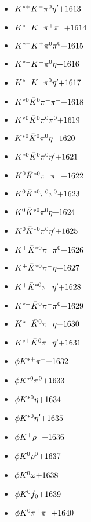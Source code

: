 \begin{multicols}{3}
\begin{itemize}
 \item $ K^{*+} K^{-} \pi^{0} {\eta^{\prime}} \hfill{+1613}$
 \item $ K^{*-} K^{+} \pi^{+} \pi^{-} \hfill{+1614}$
 \item $ K^{*-} K^{+} \pi^{0} \pi^{0} \hfill{+1615}$
 \item $ K^{*-} K^{+} \pi^{0} \eta \hfill{+1616}$
 \item $ K^{*-} K^{+} \pi^{0} {\eta^{\prime}} \hfill{+1617}$
 \item $ K^{*0} \bar{K}^{0} \pi^{+} \pi^{-} \hfill{+1618}$
 \item $ K^{*0} \bar{K}^{0} \pi^{0} \pi^{0} \hfill{+1619}$
 \item $ K^{*0} \bar{K}^{0} \pi^{0} \eta \hfill{+1620}$
 \item $ K^{*0} \bar{K}^{0} \pi^{0} {\eta^{\prime}} \hfill{+1621}$
 \item $ K^{0} \bar{K}^{*0} \pi^{+} \pi^{-} \hfill{+1622}$
 \item $ K^{0} \bar{K}^{*0} \pi^{0} \pi^{0} \hfill{+1623}$
 \item $ K^{0} \bar{K}^{*0} \pi^{0} \eta \hfill{+1624}$
 \item $ K^{0} \bar{K}^{*0} \pi^{0} {\eta^{\prime}} \hfill{+1625}$
 \item $ K^{+} \bar{K}^{*0} \pi^{-} \pi^{0} \hfill{+1626}$
 \item $ K^{+} \bar{K}^{*0} \pi^{-} \eta \hfill{+1627}$
 \item $ K^{+} \bar{K}^{*0} \pi^{-} {\eta^{\prime}} \hfill{+1628}$
 \item $ K^{*+} \bar{K}^{0} \pi^{-} \pi^{0} \hfill{+1629}$
 \item $ K^{*+} \bar{K}^{0} \pi^{-} \eta \hfill{+1630}$
 \item $ K^{*+} \bar{K}^{0} \pi^{-} {\eta^{\prime}} \hfill{+1631}$
 \item $ \phi K^{*+} \pi^{-} \hfill{+1632}$
 \item $ \phi K^{*0} \pi^{0} \hfill{+1633}$
 \item $ \phi K^{*0} \eta \hfill{+1634}$
 \item $ \phi K^{*0} {\eta^{\prime}} \hfill{+1635}$
 \item $ \phi K^{+} \rho^{-} \hfill{+1636}$
 \item $ \phi K^{0} \rho^{0} \hfill{+1637}$
 \item $ \phi K^{0} \omega \hfill{+1638}$
 \item $ \phi K^{0} f_{0} \hfill{+1639}$
 \item $ \phi K^{0} \pi^{+} \pi^{-} \hfill{+1640}$

\end{itemize}
\end{multicols}
